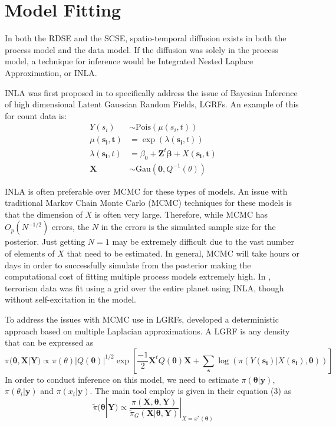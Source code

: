 \documentclass[11pt]{isuthesis}
\begin{document}
\section{Model Fitting}
In both the RDSE and the SCSE, spatio-temporal diffusion exists in both the process model and the data model.  If the diffusion was solely in the process model, a technique for inference would be Integrated Nested Laplace Approximation, or INLA.

INLA was first proposed in \cite{rue2009approximate} to specifically address the issue of Bayesian Inference of high dimensional Latent Gaussian Random Fields, LGRFs.  An example of this for count data is:
\begin{align}
Y(s_i)&\sim \mbox{Pois}(\mu(s_i,t)) \label{eq:model}\\
\mu(\boldsymbol{s_i,t})&=\exp(\lambda(\boldsymbol{s_i},t))\nonumber\\
\lambda(\boldsymbol{s_i},t) &= \beta_0 + \boldsymbol{Z}^t \boldsymbol{\beta} + X(\boldsymbol{s_i,t})\nonumber\\
\boldsymbol{X}& \sim \mbox{Gau}(\boldsymbol{0},Q^{-1}(\theta))\nonumber	
\end{align}

INLA is often preferable over MCMC for these types of models.  An issue with traditional Markov Chain Monte Carlo (MCMC) techniques for these models is that the dimension of $X$ is often very large.  Therefore, while MCMC has $O_p(N^{-1/2})$ errors, the $N$ in the errors is the simulated sample size for the posterior.  Just getting $N=1$ may be extremely difficult due to the vast number of elements of $X$ that need to be estimated.  In general, MCMC will take hours or days in order to successfully simulate from the posterior making the computational cost of fitting multiple process models extremely high.  In \cite{python2016bayesian}, terrorism data was fit using a grid over the entire planet using INLA, though without self-excitation in the model.

To address the issues with MCMC use in LGRFs, \cite{rue2009approximate} developed a deterministic approach based on multiple Laplacian approximations. A LGRF is any density that can be expressed as
\begin{equation}
\pi(\boldsymbol{\theta},\boldsymbol{X} |\boldsymbol{Y}) \propto \pi (\theta)|Q(\boldsymbol{\theta})|^{1/2}\exp \left[\frac{-1}{2}\boldsymbol{X}^t Q(\boldsymbol{\theta}) \boldsymbol{X}+\sum_{\boldsymbol{s}} \log\left(\pi(Y(\boldsymbol{s_i})|X(\boldsymbol{s_i}),\boldsymbol{\theta})\right)\right]
\end{equation} 
In order to conduct inference on this model, we need to estimate $\pi(\boldsymbol{\theta}|\boldsymbol{y})$, $\pi(\theta_i|\boldsymbol{y})$ and $\pi(x_i|\boldsymbol{y})$.  The main tool \cite{rue2009approximate} employ is given in their equation (3) as
\begin{equation}
\tilde{\pi}(\boldsymbol{\theta}|\boldsymbol{Y})\propto \frac{\pi(\boldsymbol{X},\boldsymbol{\theta},\boldsymbol{Y})}{\tilde{\pi}_G (\boldsymbol{X}|\boldsymbol{\theta},\boldsymbol{Y})}|_{X=x^*(\boldsymbol{\theta})}\label{eq:main}
\end{equation}
\end{document}
